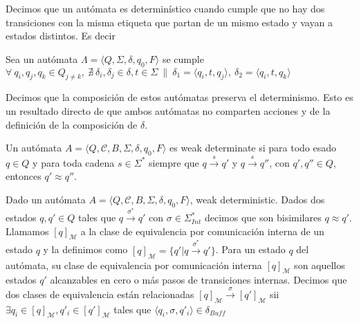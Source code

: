 \begin{definition}[Determinismo] Decimos que un autómata es determinístico cuando cumple que no hay dos transiciones con la misma etiqueta que partan de un mismo estado y vayan a estados distintos. Es decir 

\begin{centering}
Sea un autómata $ \Lambda = \langle Q, \Sigma, \delta, q_0, F \rangle$ se cumple
$ \forall \  q_i, q_j, q_k \in Q_{j \neq k}, \  \nexists \ \delta_i, \delta_j \in \delta, t \in \Sigma \ \| \  \delta_1 = \langle q_i, t, q_j \rangle, \ \delta_2 = \langle q_i, t, q_k \rangle$ \\
\end{centering} 

Decimos que la composición de estos autómatas preserva el determinismo. Esto es un resultado directo de que ambos autómatas no comparten acciones y de la definición de la composición de $\delta$.
\end{definition}

\begin{definition}Un autómata $A= \langle Q, \mathcal{C}, B, \Sigma, \delta, q_0, F \rangle$ es weak determinate si para todo esado $q \in Q$ y para toda cadena $s \in \Sigma^*$ siempre que $q \xrightarrow{s} q'$ y $q \xrightarrow{s} q''$, con $q',q'' \in Q$, entonces $q' \approx q''$.

\end{definition}

\begin{definition}
Dado un autómata $A = \langle Q, \mathcal{C}, B, \Sigma, \delta, q_0, F \rangle$, weak deterministic. Dados dos estados $q, q' \in Q$ tales que $q \xrightarrow{\sigma^*} q'$ con $\sigma \in \Sigma_{\mathit{Int}}^*$ decimos que son bisimilares $q \approx q'$. Llamamos $[q]_\mathcal{M}$ a la clase de equivalencia por comunicación interna de un estado $q$ y la definimos como $[q]_\mathcal{M}= \{q'| q \xrightarrow{\sigma^*} q'\}$. Para un estado $q$ del autómata, su clase de equivalencia por comunicación interna $[q]_\mathcal{M}$ son aquellos estados $q'$ alcanzables en cero o más pasos de transiciones internas. Decimos que dos clases de equivalencia están relacionadas $[q]_\mathcal{M} \xrightarrow{\sigma} [q']_\mathcal{M}$ sii $\exists q_i \in [q]_\mathcal{M}, q'_i \in [q']_\mathcal{M}$ tales que $\langle q_i,\sigma,q'_i \rangle \in \delta_{Buff}$
\end{definition}

